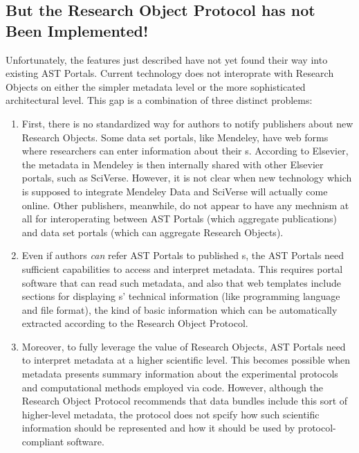 \documentclass[10pt,letterpaper]{article}
\begin{document}
\subsection{But the Research Object Protocol has not Been Implemented!}
Unfortunately, the {\RO} features just described 
have not yet found their way into existing AST  
Portals.  Current technology does not 
interoprate with Research Objects on either 
the simpler metadata level or the more sophisticated 
architectural level.  This gap is a combination 
of three distinct problems:
\p{}
\begin{enumerate}
\item First, there is no standardized way for authors 
to notify publishers about new Research Objects.  
Some data set portals, like Mendeley, have 
web forms where researchers can enter information 
about their {\RO}s.  According to Elsevier, 
the metadata in Mendeley is then internally shared 
with other Elsevier portals, such as SciVerse.  
However, it is not clear when new technology 
which is supposed to integrate Mendeley Data and 
SciVerse will actually come online.  
Other publishers, meanwhile, do not appear to have 
any mechnism at all for interoperating between 
AST Portals (which aggregate publications) and 
data set portals (which can aggregate Research Objects).

\item Even if authors \textit{can} refer AST Portals 
to published {\RO}s, the AST Portals 
need sufficient capabilities to access and 
interpret {\RO} metadata.  This 
requires portal software that can read such metadata, 
and also that web templates include sections for 
displaying {\RO}s' technical information 
(like programming language and file format), 
the kind of basic information which can be automatically 
extracted according to the Research Object Protocol.

\item Moreover, to fully leverage the value 
of Research Objects, AST Portals need to interpret 
{\RO} metadata at a higher scientific level.  
This becomes possible when {\RO} metadata 
presents summary information about the 
experimental protocols and computational 
methods employed via {\RO} code.  
However, although the Research Object Protocol 
recommends that data bundles include 
this sort of higher-level metadata, 
the protocol does not spcify how 
such scientific information should 
be represented and how it should be used 
by protocol-compliant software.  
\end{enumerate} 
 
\end{document}
